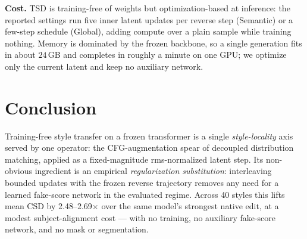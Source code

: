 \documentclass[letterpaper]{article} %
\begin{document}
\textbf{Cost.} TSD is training-free of weights but optimization-based at
inference: the reported settings run five inner latent updates per reverse step
(Semantic) or a few-step schedule (Global), adding compute over a plain sample
while training nothing. Memory is dominated by the frozen backbone, so a single
generation fits in about $24$\,GB and completes in roughly a minute on one GPU;
we optimize only the current latent and keep no auxiliary network.

\section{Conclusion}

Training-free style transfer on a frozen transformer is a single
\emph{style-locality} axis served by one operator: the CFG-augmentation spear of
decoupled distribution matching, applied as a fixed-magnitude rms-normalized
latent step. Its non-obvious ingredient is an empirical \emph{regularization
substitution}: interleaving bounded updates with the frozen reverse trajectory
removes any need for a learned fake-score network in the evaluated regime.
Across 40 styles this lifts mean CSD by 2.48--2.69$\times$ over the same model's
strongest native edit, at a modest subject-alignment cost --- with no training,
no auxiliary fake-score network, and no mask or segmentation.

\newpage
\setlength{\bibsep}{4.5pt}

\end{document}
